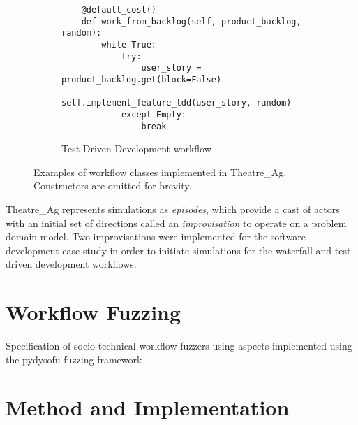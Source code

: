\documentclass{sig-alternate}
\begin{document}
\begin{figure*}
\begin{subfigure}{\linewidth}
\begin{lstlisting}
    @default_cost()
    def work_from_backlog(self, product_backlog, random):
        while True:
            try:
                user_story = product_backlog.get(block=False)
                self.implement_feature_tdd(user_story, random)
            except Empty:
                break
\end{lstlisting}
    \caption{Test Driven Development workflow}
    \label{fig:tdd}
  \end{subfigure}

  \vspace{10pt}

  \caption{Examples of workflow classes implemented in Theatre\_Ag.  Constructors are omitted for brevity.}
\end{figure*}

Theatre\_Ag represents simulations as \emph{episodes}, which provide a cast of actors with an initial set of directions
called an \emph{improvisation} to operate on a problem domain model.  Two improvisations were implemented for the
software development case study in order to initiate simulations for the waterfall and test driven development
workflows.



\section{Workflow Fuzzing}


Specification of socio-technical workflow fuzzers using aspects implemented using the pydysofu
fuzzing framework 



\section{Method and Implementation}
\label{sec:fuzzi-moss}

\end{document}
